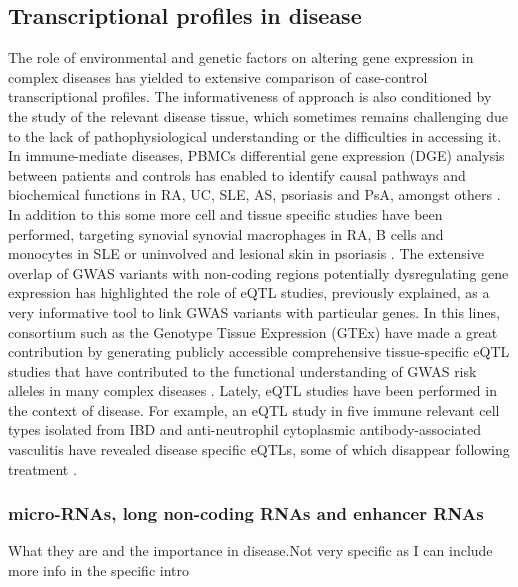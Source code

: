 \subsection{Transcriptional profiles in disease}
The role of environmental and genetic factors on altering gene expression in complex diseases has yielded to extensive comparison of case-control transcriptional profiles. The informativeness of approach is also conditioned by the study of the relevant disease tissue, which sometimes remains challenging due to the lack of pathophysiological understanding or the difficulties in accessing it. In immune-mediate diseases, PBMCs differential gene expression (DGE) analysis between patients and controls has enabled to identify causal pathways and biochemical functions in RA, UC, SLE, AS, psoriasis and PsA, amongst others \parencite{MIao2013,Junta2009,Baechler2003,Assassi2010,Batliwalla2005}. In addition to this some more cell and tissue specific studies have been performed, targeting synovial synovial macrophages in RA, B cells and monocytes in SLE or uninvolved and lesional skin in psoriasis \parencite{Katschke2001,Dozmorov2015,Jabbari2012}. The extensive overlap of GWAS variants with non-coding regions potentially dysregulating gene expression has highlighted the role of eQTL studies, previously explained, as a very informative tool to link GWAS variants with particular genes. In this lines, consortium such as the Genotype
Tissue Expression (GTEx) have made a great contribution by generating publicly accessible comprehensive tissue-specific eQTL studies that have contributed to the functional understanding of GWAS risk alleles in many complex diseases . Lately, eQTL studies have been performed in the context of disease. For example, an eQTL study in five immune relevant cell types isolated from IBD and anti-neutrophil cytoplasmic antibody-associated vasculitis have revealed disease specific eQTLs, some of which disappear following treatment \parencite{Peters2016}.


\subsubsection{micro-RNAs, long non-coding RNAs and enhancer RNAs}
What they are and the importance in disease.Not very specific as I can include more info in the specific intro

